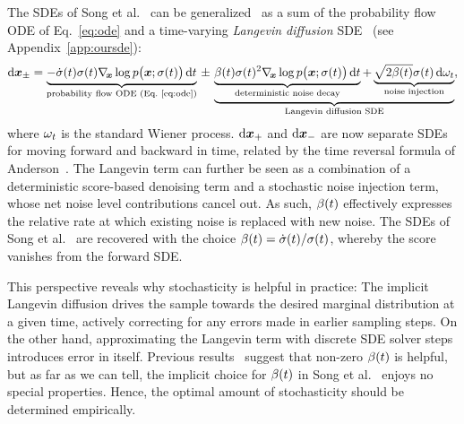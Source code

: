 \documentclass{article}
\begin{document}
\label{sec:stochasticbackground}
The %
SDEs of Song et al.~\cite{Song2021sde} can be generalized~\cite{Huang2021,Zhang2021} as a sum of the probability flow ODE of Eq.~\ref{eq:ode} and a {time-varying} \emph{Langevin diffusion} SDE~\cite{Grenander1994} {(see Appendix~\ref{app:oursde})}:
\begin{equation}
  \label{eq:sde}
  \mathrm{d} \boldsymbol{x}_{\pm} =
    \underbrace{-\dot\sigma(t) \sigma(t) \nabla_{\hspace{-0.5mm}\boldsymbol{x}} \log p\big( \boldsymbol{x}; \sigma(t) \big) \,\mathrm{d}t}_{\text{probability flow ODE (Eq.~\ref{eq:ode})}}\,\pm\,
    \underbrace{
      \underbrace{\beta(t) \sigma(t)^2 \nabla_{\hspace{-0.5mm}\boldsymbol{x}} \log p\big( \boldsymbol{x}; \sigma(t) \big) \,\mathrm{d}t}_{\text{deterministic noise decay}} +
      \underbrace{\sqrt{2 \beta(t)} \sigma(t) \,\mathrm{d}\omega_t}_{\text{noise injection}}
    }_{\text{Langevin diffusion SDE}} ,
\end{equation}
where {$\omega_t$} is the standard Wiener process.
$\mathrm{d} \boldsymbol{x}_+$ and $\mathrm{d} \boldsymbol{x}_-$ are now separate SDEs for moving forward and backward in time, related by the time reversal formula of Anderson~\cite{Anderson1982}.
The Langevin term can further be seen as a combination of %
  a deterministic score-based denoising term and a stochastic noise injection term, whose net noise level contributions cancel out.
As such, $\beta(t)$ effectively expresses the relative rate at which existing noise is replaced with new noise.
The SDEs of Song et al.~\cite{Song2021sde} are recovered with the choice $\beta(t) = {\dot \sigma(t)}/{\sigma(t)}$, whereby the score vanishes from the forward SDE.

\algStochastic

This perspective reveals why stochasticity is helpful in practice:
  The implicit Langevin diffusion drives the sample towards the desired marginal distribution at a given time, actively correcting for any errors made in earlier sampling steps.
On the other hand, approximating the Langevin term with discrete SDE solver steps introduces error in itself.
Previous results~\cite{Bao2022analytic,Jolicoeur2021,Song2020ddim,Song2021sde} suggest that non-zero $\beta(t)$ is helpful, but
  as far as we can tell, the implicit choice for $\beta(t)$ in Song et al.~\cite{Song2021sde} enjoys no special properties.
Hence, the optimal amount of stochasticity should be determined empirically.
\end{document}
